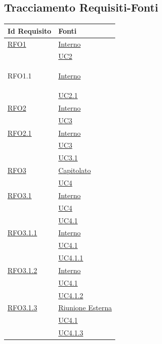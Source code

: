 \subsection{Tracciamento Requisiti-Fonti}
\normalsize
\begin{longtable}{|>{\centering}m{5cm}|m{5cm}<{\centering}|}
\hline
\textbf{Id Requisito} & \textbf{Fonti}\\
\hline
\endhead
\hyperlink{RFO1}{RFO1} & \hyperlink{Interno}{Interno}\\
& \hyperref[UC2]{UC2}\\ \hline

\hypertarget{RFO1.1}{RFO1.1} & \hyperlink{Interno}{Interno}\\
& \hyperref[UC2.1]{UC2.1}\\ \hline

\hyperlink{RFO2}{RFO2} & \hyperlink{Interno}{Interno}\\
& \hyperref[UC3]{UC3}\\ \hline

\hyperlink{RFO2.1}{RFO2.1} & \hyperlink{Interno}{Interno}\\
& \hyperref[UC3]{UC3}\\ 
& \hyperref[UC3.1]{UC3.1}\\\hline

\hyperlink{RFO3}{RFO3} & \hyperlink{Capitolato}{Capitolato}\\
& \hyperref[UC4]{UC4}\\ \hline

\hyperlink{RFO3.1}{RFO3.1} & \hyperlink{Interno}{Interno}\\
& \hyperref[UC4]{UC4}\\
& \hyperref[UC4.1]{UC4.1}\\ \hline

\hyperlink{RFO3.1.1}{RFO3.1.1} & \hyperlink{Interno}{Interno}\\
& \hyperref[UC4.1]{UC4.1}\\
& \hyperref[UC4.1.1]{UC4.1.1}\\ \hline

\hyperlink{RFO3.1.2}{RFO3.1.2} & \hyperlink{Interno}{Interno}\\
& \hyperref[UC4.1]{UC4.1}\\
& \hyperref[UC4.1.2]{UC4.1.2}\\ \hline

\hyperlink{RFO3.1.3}{RFO3.1.3} & \hyperlink{Riunione Esterna}{Riunione Esterna}\\
& \hyperref[UC4.1]{UC4.1}\\
& \hyperref[UC4.1.3]{UC4.1.3}\\ \hline


\end{longtable}

